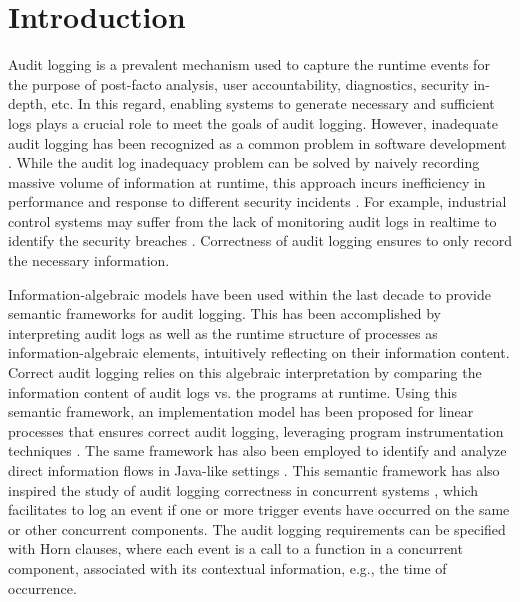 \section{Introduction} \label{sec:intro}

Audit logging is a prevalent mechanism used to capture the runtime events for the purpose of post-facto analysis, user accountability, diagnostics, security in-depth, etc. In this regard, enabling systems to generate necessary and sufficient logs plays a crucial role to meet the goals of audit logging. However, inadequate audit logging has been recognized as a common problem in software development \cite{cwe778,owasp-top-ten}. While the audit log inadequacy  problem can be solved by naively recording massive volume of information at runtime, this approach incurs inefficiency in performance  and response to different security incidents \cite{cwe779}. For example, industrial control systems may suffer from the lack of monitoring audit logs in realtime to identify the security breaches \cite{controlsys}. Correctness of audit logging ensures to only record the necessary information. 

Information-algebraic \cite{Kohlas14}  models have been used within the last decade to provide semantic frameworks for audit logging. This has been accomplished by interpreting audit logs as well as the runtime structure of processes as information-algebraic elements, intuitively reflecting on their information content. Correct audit logging relies on this algebraic interpretation by comparing the information content of audit logs vs. the programs at runtime. Using this semantic framework, an implementation model has been proposed for linear processes that ensures correct audit logging, leveraging program instrumentation techniques \cite{post16}. The same framework has also been employed to identify and analyze direct information flows in Java-like settings \cite{amir-skalka-plas16, jcs20}. This semantic framework has also inspired the study of audit logging correctness in concurrent systems \cite{lsfa20}, which facilitates to log an event if one or more trigger events have occurred on the same or other concurrent components. The audit logging requirements can be specified with Horn clauses, where each event is a call to a function in a concurrent component, associated with its contextual information, e.g., the time of occurrence. 


